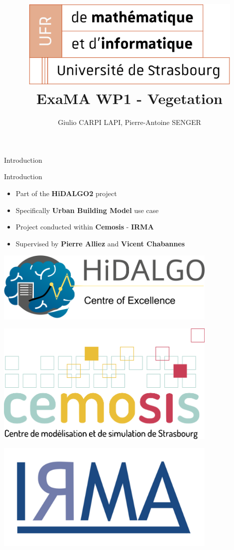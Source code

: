 \documentclass[10pt]{beamer}
\title[exMA WP1 Vegetation]{
  \includegraphics[width=0.8\textwidth]{images/logo_ufr.png}
  ExaMA WP1 - Vegetation}
\author[Carpi Lapi - Senger]{Giulio CARPI LAPI, Pierre-Antoine SENGER}
\begin{document}
\begin{frame}{Introduction}
  \titlepage
\end{frame}

\begin{frame}{Introduction}
  \Large
  \begin{itemize}
    \Large
    \item Part of the \textbf{HiDALGO2} project
    \item Specifically \textbf{Urban Building Model} use case
    \item Project conducted within \textbf{Cemosis} - \textbf{IRMA}
    \item Supervised by \textbf{Pierre Alliez} and \textbf{Vicent Chabannes}
  \end{itemize}
  \vfill %
  \centering
  \begin{minipage}{0.3\textwidth}
      \centering
      \includegraphics[width=0.8\textwidth]{images/hidalgo2.png}
  \end{minipage}
  \begin{minipage}{0.3\textwidth}
      \centering
      \includegraphics[width=0.8\textwidth]{images/logo-cemosis.png}
  \end{minipage}
  \begin{minipage}{0.3\textwidth}
      \centering
      \includegraphics[width=0.8\textwidth]{images/logo_irma.png}
  \end{minipage}
\end{frame}
\end{document}

